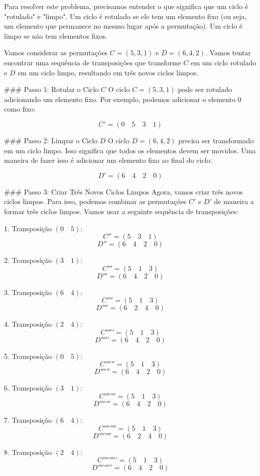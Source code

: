 Para resolver este problema, precisamos entender o que significa que um ciclo é "rotulado" e "limpo". Um ciclo é rotulado se ele tem um elemento fixo (ou seja, um elemento que permanece no mesmo lugar após a permutação). Um ciclo é limpo se não tem elementos fixos.

Vamos considerar as permutações $C = (5, 3, 1)$ e $D = (6, 4, 2)$. Vamos tentar encontrar uma sequência de transposições que transforme $C$ em um ciclo rotulado e $D$ em um ciclo limpo, resultando em três novos ciclos limpos.

### Passo 1: Rotular o Ciclo $C$
O ciclo $C = (5, 3, 1)$ pode ser rotulado adicionando um elemento fixo. Por exemplo, podemos adicionar o elemento 0 como fixo:

\[ C' = (0 \quad 5 \quad 3 \quad 1) \]

### Passo 2: Limpar o Ciclo $D$
O ciclo $D = (6, 4, 2)$ precisa ser transformado em um ciclo limpo. Isso significa que todos os elementos devem ser movidos. Uma maneira de fazer isso é adicionar um elemento fixo ao final do ciclo:

\[ D' = (6 \quad 4 \quad 2 \quad 0) \]

### Passo 3: Criar Três Novos Ciclos Limpos
Agora, vamos criar três novos ciclos limpos. Para isso, podemos combinar as permutações $C'$ e $D'$ de maneira a formar três ciclos limpos. Vamos usar a seguinte sequência de transposições:

1. Transposição $(0 \quad 5)$:
   \[ C'' = (5 \quad 3 \quad 1) \]
   \[ D'' = (6 \quad 4 \quad 2 \quad 0) \]

2. Transposição $(3 \quad 1)$:
   \[ C''' = (5 \quad 1 \quad 3) \]
   \[ D''' = (6 \quad 4 \quad 2 \quad 0) \]

3. Transposição $(6 \quad 4)$:
   \[ C'''' = (5 \quad 1 \quad 3) \]
   \[ D'''' = (6 \quad 2 \quad 4 \quad 0) \]

4. Transposição $(2 \quad 4)$:
   \[ C''''' = (5 \quad 1 \quad 3) \]
   \[ D''''' = (6 \quad 4 \quad 2 \quad 0) \]

5. Transposição $(0 \quad 5)$:
   \[ C'''''' = (5 \quad 1 \quad 3) \]
   \[ D'''''' = (6 \quad 4 \quad 2 \quad 0) \]

6. Transposição $(3 \quad 1)$:
   \[ C''''''' = (5 \quad 1 \quad 3) \]
   \[ D''''''' = (6 \quad 4 \quad 2 \quad 0) \]

7. Transposição $(6 \quad 4)$:
   \[ C'''''''' = (5 \quad 1 \quad 3) \]
   \[ D'''''''' = (6 \quad 2 \quad 4 \quad 0) \]

8. Transposição $(2 \quad 4)$:
   \[ C''''''''' = (5 \quad 1 \quad 3) \]
   \[ D''''''''' = (6 \quad 4 \quad 2 \quad 0) \]

